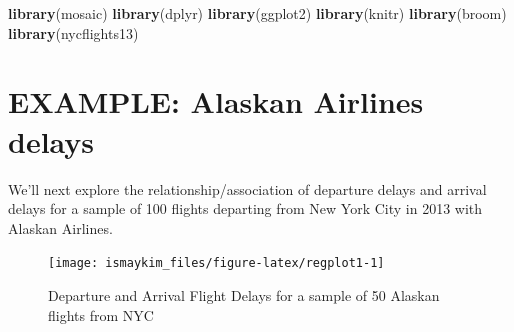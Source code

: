\documentclass[]{tufte-book}
\newenvironment{Shaded}{\begin{snugshade}}{\end{snugshade}}
\newcommand{\KeywordTok}[1]{\textcolor[rgb]{0.13,0.29,0.53}{\textbf{{#1}}}}
\newcommand{\DataTypeTok}[1]{\textcolor[rgb]{0.13,0.29,0.53}{{#1}}}
\newcommand{\DecValTok}[1]{\textcolor[rgb]{0.00,0.00,0.81}{{#1}}}
\newcommand{\StringTok}[1]{\textcolor[rgb]{0.31,0.60,0.02}{{#1}}}
\newcommand{\CommentTok}[1]{\textcolor[rgb]{0.56,0.35,0.01}{\textit{{#1}}}}
\newcommand{\OtherTok}[1]{\textcolor[rgb]{0.56,0.35,0.01}{{#1}}}
\newcommand{\NormalTok}[1]{{#1}}
\begin{document}
\begin{Shaded}
\begin{Highlighting}[]
\KeywordTok{library}\NormalTok{(mosaic)}
\KeywordTok{library}\NormalTok{(dplyr)}
\KeywordTok{library}\NormalTok{(ggplot2)}
\KeywordTok{library}\NormalTok{(knitr)}
\KeywordTok{library}\NormalTok{(broom)}
\KeywordTok{library}\NormalTok{(nycflights13)}
\end{Highlighting}
\end{Shaded}

\section{EXAMPLE: Alaskan Airlines
delays}\label{example-alaskan-airlines-delays}

We'll next explore the relationship/association of departure delays and
arrival delays for a sample of 100 flights departing from New York City
in 2013 with Alaskan Airlines.

\begin{Shaded}
\end{Shaded}

\begin{figure}

{\centering \texttt{[image: ismaykim\_files/figure-latex/regplot1-1]} 

}

\caption[Departure and Arrival Flight Delays for a sample of 50 Alaskan flights from NYC]{Departure and Arrival Flight Delays for a sample of 50 Alaskan flights from NYC}\label{fig:regplot1}
\end{figure}
\end{document}
